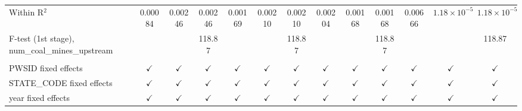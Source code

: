 \begin{table}[htbp]
\begin{adjustbox}{width = \textwidth, center}
\begin{tabular}{lcccccccccccc}
         Within R$^2$                                      & 0.00084       & 0.00246        & 0.00246       & 0.00169       & 0.00210        & 0.00210       & 0.00204       & 0.00168       & 0.00168       & 0.00666       & $1.18\times 10^{-5}$  & $1.18\times 10^{-5}$\\   
         F-test (1st stage), num\_coal\_mines\_upstream    &               &                & 118.87        &               &                & 118.87        &               &               & 118.87        &               &                       & 118.87\\  
          \\
         PWSID fixed effects                               & $\checkmark$  & $\checkmark$   & $\checkmark$  & $\checkmark$  & $\checkmark$   & $\checkmark$  & $\checkmark$  & $\checkmark$  & $\checkmark$  & $\checkmark$  & $\checkmark$          & $\checkmark$\\   
         STATE\_CODE fixed effects                         & $\checkmark$  & $\checkmark$   & $\checkmark$  & $\checkmark$  & $\checkmark$   & $\checkmark$  & $\checkmark$  & $\checkmark$  & $\checkmark$  & $\checkmark$  & $\checkmark$          & $\checkmark$\\   
         year fixed effects                                & $\checkmark$  & $\checkmark$   & $\checkmark$  & $\checkmark$  & $\checkmark$   & $\checkmark$  & $\checkmark$  & $\checkmark$  & $\checkmark$  & $\checkmark$  & $\checkmark$          & $\checkmark$\\   
         \bottomrule
      \end{tabular}
   \end{adjustbox}
\end{table}


